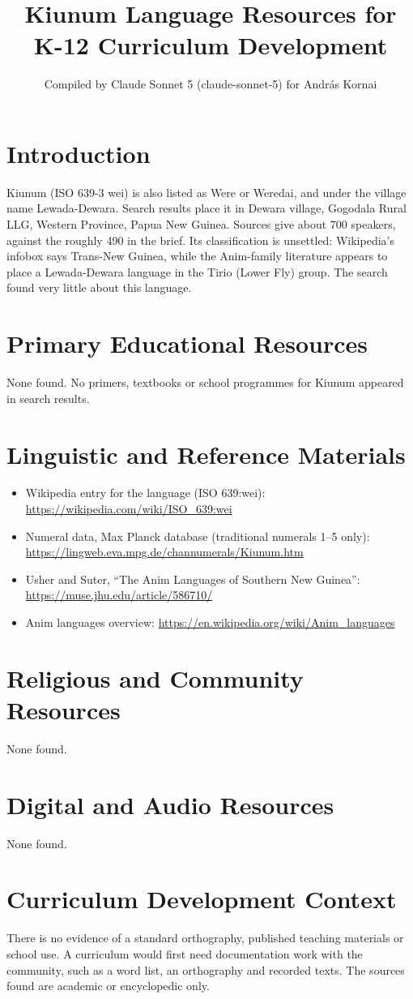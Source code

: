 \documentclass[12pt]{article}
\title{Kiunum Language Resources for K-12 Curriculum Development}
\author{Compiled by Claude Sonnet 5 (claude-sonnet-5) for Andr\'as Kornai}
\date{}
\begin{document}
\maketitle
\section{Introduction}
Kiunum (ISO 639-3 wei) is also listed as Were or Weredai, and under the village name Lewada-Dewara. Search results place it in Dewara village, Gogodala Rural LLG, Western Province, Papua New Guinea. Sources give about 700 speakers, against the roughly 490 in the brief. Its classification is unsettled: Wikipedia's infobox says Trans-New Guinea, while the Anim-family literature appears to place a Lewada-Dewara language in the Tirio (Lower Fly) group. The search found very little about this language.
\section{Primary Educational Resources}
None found. No primers, textbooks or school programmes for Kiunum appeared in search results.
\section{Linguistic and Reference Materials}
\begin{itemize}
\item Wikipedia entry for the language (ISO 639:wei): \url{https://wikipedia.com/wiki/ISO_639:wei}
\item Numeral data, Max Planck database (traditional numerals 1--5 only): \url{https://lingweb.eva.mpg.de/channumerals/Kiunum.htm}
\item Usher and Suter, ``The Anim Languages of Southern New Guinea'': \url{https://muse.jhu.edu/article/586710/}
\item Anim languages overview: \url{https://en.wikipedia.org/wiki/Anim_languages}
\end{itemize}
\section{Religious and Community Resources}
None found.
\section{Digital and Audio Resources}
None found.
\section{Curriculum Development Context}
There is no evidence of a standard orthography, published teaching materials or school use. A curriculum would first need documentation work with the community, such as a word list, an orthography and recorded texts. The sources found are academic or encyclopedic only.
\end{document}
